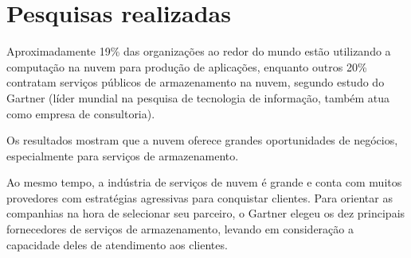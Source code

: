 \section{Pesquisas realizadas}

Aproximadamente 19\% das organizações ao redor do mundo estão utilizando a
computação na nuvem para produção de aplicações, enquanto outros 20\% contratam
serviços públicos de armazenamento na nuvem, segundo estudo do Gartner (líder
mundial na pesquisa de tecnologia de informação, também atua como empresa de
consultoria).

Os resultados mostram que a nuvem oferece grandes oportunidades de negócios,
especialmente para serviços de armazenamento. 

Ao mesmo tempo, a indústria de serviços de nuvem é grande e conta com muitos
provedores com estratégias agressivas para conquistar clientes. Para orientar as
companhias na hora de selecionar seu parceiro, o Gartner elegeu os dez principais
fornecedores de serviços de armazenamento, levando em consideração a capacidade
deles de atendimento aos clientes.
